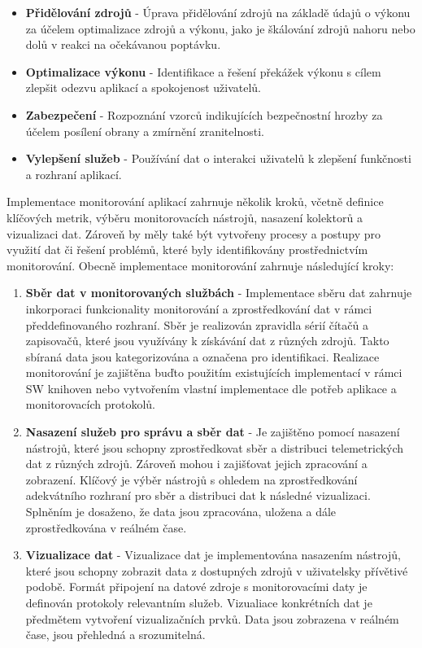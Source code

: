 \begin{itemize}
    \item \textbf{Přidělování zdrojů} - Úprava přidělování zdrojů na základě údajů o výkonu za účelem optimalizace zdrojů a výkonu, jako je škálování zdrojů nahoru nebo dolů v reakci na očekávanou poptávku.
    \item \textbf{Optimalizace výkonu} - Identifikace a řešení překážek výkonu s cílem zlepšit odezvu aplikací a spokojenost uživatelů.
    \item \textbf{Zabezpečení} - Rozpoznání vzorců indikujících bezpečnostní hrozby za účelem posílení obrany a zmírnění zranitelnosti.
    \item \textbf{Vylepšení služeb} - Používání dat o interakci uživatelů k zlepšení funkčnosti a rozhraní aplikací.
\end{itemize}


Implementace monitorování aplikací zahrnuje několik kroků, včetně definice klíčových metrik, výběru monitorovacích nástrojů, nasazení kolektorů a vizualizaci dat. Zároveň by měly také být vytvořeny procesy a postupy pro využití dat či řešení problémů, které byly identifikovány prostřednictvím monitorování. \cite{Blanco2023} Obecně implementace monitorování zahrnuje následující kroky:

\begin{enumerate}
    \item \textbf{Sběr dat v monitorovaných službách} - Implementace sběru dat zahrnuje inkorporaci funkcionality monitorování a zprostředkování dat v rámci předdefinovaného rozhraní. Sběr je realizován zpravidla sérií čítačů a zapisovačů, které jsou využívány k získávání dat z různých zdrojů. Takto sbíraná data jsou kategorizována a označena pro identifikaci. Realizace monitorování je zajištěna buďto použitím existujících implementací v rámci SW knihoven nebo vytvořením vlastní implementace dle potřeb aplikace a monitorovacích protokolů.
    \item \textbf{Nasazení služeb pro správu a sběr dat} - Je zajištěno pomocí nasazení nástrojů, které jsou schopny zprostředkovat sběr a distribuci telemetrických dat z různých zdrojů. Zároveň mohou i zajišťovat jejich zpracování a zobrazení. Klíčový je výběr nástrojů s ohledem na zprostředkování adekvátního rozhraní pro sběr a distribuci dat k následné vizualizaci. Splněním je dosaženo, že data jsou zpracována, uložena a dále zprostředkována v reálném čase.
    \item \textbf{Vizualizace dat} - Vizualizace dat je implementována nasazením nástrojů, které jsou schopny zobrazit data z dostupných zdrojů v uživatelsky přívětivé podobě. Formát připojení na datové zdroje s monitorovacími daty je definován protokoly relevantním služeb. Vizualiace konkrétních dat je předmětem vytvoření vizualizačních prvků. Data jsou zobrazena v reálném čase, jsou přehledná a srozumitelná.
\end{enumerate}

